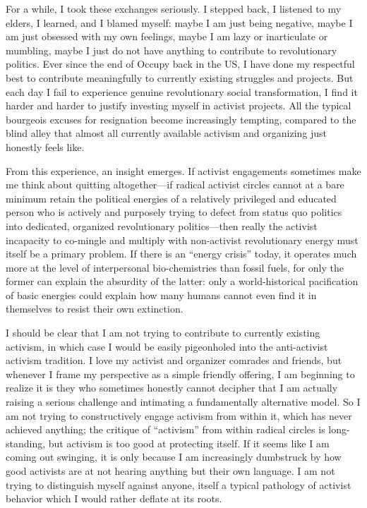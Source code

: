 \documentclass[a4paper,12pt,margin=.5in]{article}
\begin{document}
For a while, I took these exchanges seriously. I stepped back, I
listened to my elders, I learned, and I blamed myself: maybe I am just
being negative, maybe I am just obsessed with my own feelings, maybe I
am lazy or inarticulate or mumbling, maybe I just do not have anything
to contribute to revolutionary politics. Ever since the end of Occupy
back in the US, I have done my respectful best to contribute
meaningfully to currently existing struggles and projects. But each day
I fail to experience genuine revolutionary social transformation, I find
it harder and harder to justify investing myself in activist projects.
All the typical bourgeois excuses for resignation become increasingly
tempting, compared to the blind alley that almost all currently
available activism and organizing just honestly feels like.

From this experience, an insight emerges. If activist engagements
sometimes make me think about quitting altogether---if radical activist
circles cannot at a bare minimum retain the political energies of a
relatively privileged and educated person who is actively and purposely
trying to defect from status quo politics into dedicated, organized
revolutionary politics---then really the activist incapacity to
co-mingle and multiply with non-activist revolutionary energy must
itself be a primary problem. If there is an ``energy crisis'' today, it
operates much more at the level of interpersonal bio-chemistries than
fossil fuels, for only the former can explain the absurdity of the
latter: only a world-historical pacification of basic energies could
explain how many humans cannot even find it in themselves to resist
their own extinction.

I should be clear that I am not trying to contribute to currently
existing activism, in which case I would be easily pigeonholed into the
anti-activist activism tradition. I love my activist and organizer
comrades and friends, but whenever I frame my perspective as a simple
friendly offering, I am beginning to realize it is they who sometimes
honestly cannot decipher that I am actually raising a serious challenge
and intimating a fundamentally alternative model. So I am not trying to
constructively engage activism from within it, which has never achieved
anything; the critique of ``activism'' from within radical circles is
long-standing, but activism is too good at protecting itself. If it
seems like I am coming out swinging, it is only because I am
increasingly dumbstruck by how good activists are at not hearing
anything but their own language. I am not trying to distinguish myself
against anyone, itself a typical pathology of activist behavior which I
would rather deflate at its roots.
\end{document}
